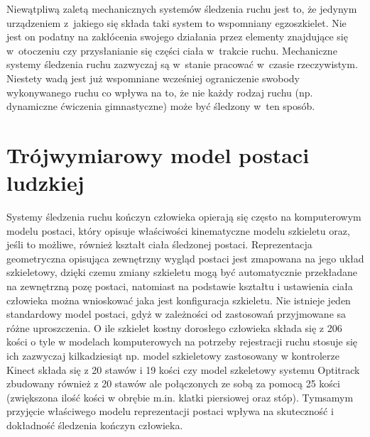 Niewątpliwą zaletą mechanicznych systemów śledzenia ruchu jest to, że jedynym urządzeniem z~jakiego się składa taki system to wspomniany egzoszkielet. Nie jest on podatny na zakłócenia swojego działania przez elementy znajdujące się w~otoczeniu czy przysłanianie się części ciała w~trakcie ruchu. Mechaniczne systemy śledzenia ruchu zazwyczaj są w~stanie pracować w~czasie rzeczywistym. Niestety wadą jest już wspomniane wcześniej ograniczenie swobody wykonywanego ruchu co wpływa na to, że nie każdy rodzaj ruchu (np. dynamiczne ćwiczenia gimnastyczne) może być śledzony w~ten sposób.

\section{Trójwymiarowy model postaci ludzkiej} \label{chap:bodyRep}
Systemy śledzenia ruchu kończyn człowieka opierają się często na komputerowym modelu postaci, który opisuje właściwości kinematyczne modelu szkieletu oraz, jeśli to możliwe, również kształt ciała śledzonej postaci. Reprezentacja geometryczna opisująca zewnętrzny wygląd postaci jest zmapowana na jego układ szkieletowy, dzięki czemu zmiany szkieletu mogą być automatycznie przekładane na zewnętrzną pozę postaci, natomiast na podstawie kształtu i ustawienia ciała człowieka można wnioskować jaka jest konfiguracja szkieletu. 
Nie istnieje jeden standardowy model postaci, gdyż w zależności od zastosowań przyjmowane sa różne uproszczenia. O ile szkielet kostny dorosłego człowieka składa się z 206 kości \cite{Lasinski1990} o tyle w modelach komputerowych na potrzeby rejestracji ruchu stosuje się ich zazwyczaj kilkadziesiąt np. model szkieletowy zastosowany w kontrolerze Kinect składa się z 20 stawów i 19 kości\cite{msdn:kinectSkeleton} czy model szkeletowy systemu Optitrack zbudowany również z 20 stawów ale połączonych ze sobą za pomocą 25 kości\cite{optitrackSkeleton} (zwiększona ilość kości w obrębie m.in. klatki piersiowej oraz stóp). Tymsamym przyjęcie właściwego modelu reprezentacji postaci wpływa na skuteczność i dokładność śledzenia kończyn człowieka.

